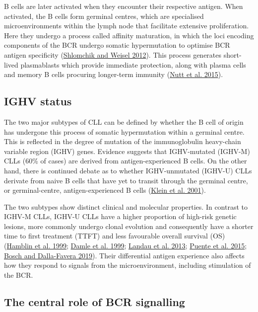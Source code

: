 \documentclass[11pt, a4paper, twosided]{book}
\begin{document}
B cells are later activated when they encounter their respective antigen. When activated, the B cells form germinal centres, which are specialised microenvironments within the lymph node that facilitate extensive proliferation. Here they undergo a process called affinity maturation, in which the loci encoding components of the BCR undergo somatic hypermutation to optimise BCR antigen specificity (\protect\hyperlink{ref-Shlomchik2012}{Shlomchik and Weisel 2012}). This process generates short-lived plasmablasts which provide immediate protection, along with plasma cells and memory B cells procuring longer-term immunity (\protect\hyperlink{ref-Nutt2015}{Nutt et al. 2015}).

\hypertarget{intro-ighv-status}{%
\subsection{IGHV status}\label{intro-ighv-status}}

The two major subtypes of CLL can be defined by whether the B cell of origin has undergone this process of somatic hypermutation within a germinal centre. This is reflected in the degree of mutation of the immunoglobulin heavy-chain variable region (IGHV) genes. Evidence suggests that IGHV-mutated (IGHV-M) CLLs (60\% of cases) are derived from antigen-experienced B cells. On the other hand, there is continued debate as to whether IGHV-unmutated (IGHV-U) CLLs derivate from naive B cells that have yet to transit through the germinal centre, or germinal-centre, antigen-experienced B cells (\protect\hyperlink{ref-Klein2001}{Klein et al. 2001}).

The two subtypes show distinct clinical and molecular properties. In contrast to IGHV-M CLLs, IGHV-U CLLs have a higher proportion of high-risk genetic lesions, more commonly undergo clonal evolution and consequently have a shorter time to first treatment (TTFT) and less favourable overall survival (OS) (\protect\hyperlink{ref-Hamblin1999}{Hamblin et al. 1999}; \protect\hyperlink{ref-Damle1999}{Damle et al. 1999}; \protect\hyperlink{ref-Landau2013}{Landau et al. 2013}; \protect\hyperlink{ref-Puente2015}{Puente et al. 2015}; \protect\hyperlink{ref-Bosch2019}{Bosch and Dalla-Favera 2019}). Their differential antigen experience also affects how they respond to signals from the microenvironment, including stimulation of the BCR.

\hypertarget{intro-bcr-signalling}{%
\subsection{The central role of BCR signalling}\label{intro-bcr-signalling}}
\end{document}

